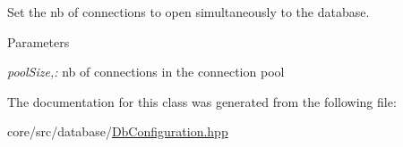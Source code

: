 Set the nb of connections to open simultaneously to the database. 


\begin{DoxyParams}{Parameters}
\item[{\em poolSize,:}]nb of connections in the connection pool \end{DoxyParams}


The documentation for this class was generated from the following file:\begin{DoxyCompactItemize}
\item 
core/src/database/\hyperlink{DbConfiguration_8hpp}{DbConfiguration.hpp}\end{DoxyCompactItemize}
